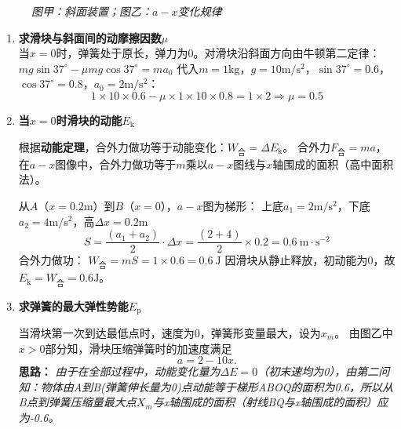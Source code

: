 \documentclass[CJKmath,a4paper,10pt]{ctexart}
\begin{document}
\begin{liti}
\begin{figure}[H]
	\caption{\emph{图甲：斜面装置；图乙：$a-x$变化规律}}
\end{figure}
\tcblower
\begin{enumerate}
	\item \textbf{求滑块与斜面间的动摩擦因数$\mu$}\\
	当$x=0$时，弹簧处于原长，弹力为$0$。对滑块沿斜面方向由牛顿第二定律：$mg\sin37^\circ - \mu mg\cos37^\circ = ma_0$
代入$m=1\mathrm{kg}$，$g=10\mathrm{m/s^2}$，$\sin37^\circ=0.6$，$\cos37^\circ=0.8$，$a_0=2\mathrm{m/s^2}$：
\[1\times10\times0.6 - \mu\times1\times10\times0.8 = 1\times2 \Rightarrow \mu = 0.5\]


\item \textbf{当$x=0$时滑块的动能$E_\text{k}$}

根据\textbf{动能定理}，合外力做功等于动能变化：$W_\text{合} = \Delta E_\text{k}$。
合外力$F_\text{合}=ma$，在$a-x$图像中，合外力做功等于$m$乘以$a-x$图线与$x$轴围成的面积（高中面积法）。

从$A$（$x=0.2\mathrm{m}$）到$B$（$x=0$），$a-x$图为梯形：
上底$a_1=2\mathrm{m/s^2}$，下底$a_2=4\mathrm{m/s^2}$，高$\Delta x=0.2\mathrm{m}$
\[
S = \frac{(a_1+a_2)}{2} \cdot \Delta x = \frac{(2+4)}{2} \times 0.2 = 0.6\ \mathrm{m\cdot s^{-2}}
\]
合外力做功：
$
W_\text{合} = mS = 1\times0.6 = 0.6\ \mathrm{J}
$
因滑块从静止释放，初动能为$0$，故$E_\text{k} = W_\text{合} = 0.6\mathrm{J}$。

\item \textbf{求弹簧的最大弹性势能$E_\text{p}$}

当滑块第一次到达最低点时，速度为$0$，弹簧形变量最大，设为$x_m$。
由图乙中$x>0$部分知，滑块压缩弹簧时的加速度满足
\[
a=2-10x.
\]
\textbf{思路：} 
	\emph{由于在全部过程中，动能变化量为$\Delta E = 0$（初末速均为0），由第二问知：物体由A到B(弹簧伸长量为0)点动能等于梯形ABOQ的面积为0.6，所以从B点到弹簧压缩量最大点$X_m$与x轴围成的面积（射线BQ与x轴围成的面积）应为-0.6。
	}
	

\end{enumerate}
\end{liti}
\end{document}

